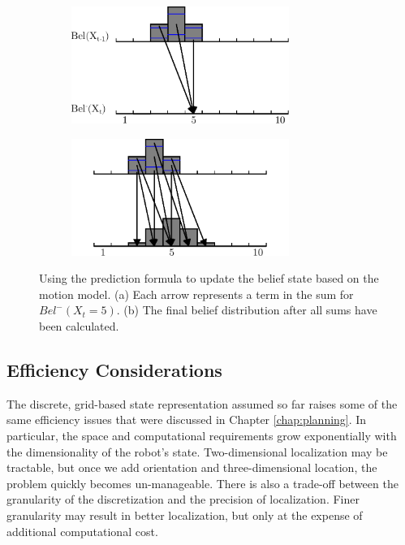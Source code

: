 \begin{figure}
  \begin{center}
    \begin{subfigure}[b]{0.4\textwidth}
      \includegraphics[height=1.5in]{probability/figs/motion_calc.pdf}
      \caption{ }
    \end{subfigure} \hspace*{1in}
    \begin{subfigure}[b]{0.4\textwidth}
      \includegraphics[height=1.5in]{probability/figs/motion_calc_done.pdf}
      \caption{}
    \end{subfigure}
  \end{center}
  \caption{Using the prediction formula to update the belief state
    based on the motion model. (a) Each arrow represents a term in the
    sum for $Bel^{-}(X_t = 5)$.  (b) The final belief distribution
    after all sums have been calculated.}
  \label{fig:motion_update}
\end{figure}

\subsection{Efficiency Considerations}

The discrete, grid-based state representation assumed so far raises
some of the same efficiency issues that were discussed in Chapter
\ref{chap:planning}.  In particular, the space and
computational requirements grow exponentially with the dimensionality of
the robot's state.  Two-dimensional localization may be tractable, but
once we add orientation and three-dimensional location, the problem
quickly becomes un-manageable. There is also a trade-off between the
granularity of the discretization and the precision of localization.
Finer granularity may result in better localization, but only at the
expense of additional computational cost.

